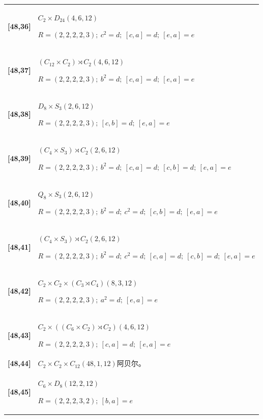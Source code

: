 \documentclass[UTF8,fontset=fandol,11pt,a4paper]{ctexart}
\begin{document}
\begin{longtable}{@{}p{17mm}>{\raggedright\arraybackslash}p{141mm}@{}}
\textbf{[48,36]} & $C_{2}\times D_{24}$\quad $(4,6,12)$\par\(R=(2,2,2,2,3);\allowbreak\ c^{2}=d;\allowbreak\ [c,a]=d;\allowbreak\ [e,a]=e\)\\[3pt]

\textbf{[48,37]} & $(C_{12}\times C_{2})\rtimes C_{2}$\quad $(4,6,12)$\par\(R=(2,2,2,2,3);\allowbreak\ b^{2}=d;\allowbreak\ [c,a]=d;\allowbreak\ [e,a]=e\)\\[3pt]

\textbf{[48,38]} & $D_{8}\times S_{3}$\quad $(2,6,12)$\par\(R=(2,2,2,2,3);\allowbreak\ [c,b]=d;\allowbreak\ [e,a]=e\)\\[3pt]

\textbf{[48,39]} & $(C_{4}\times S_{3})\rtimes C_{2}$\quad $(2,6,12)$\par\(R=(2,2,2,2,3);\allowbreak\ b^{2}=d;\allowbreak\ [c,a]=d;\allowbreak\ [c,b]=d;\allowbreak\ [e,a]=e\)\\[3pt]

\textbf{[48,40]} & $Q_{8}\times S_{3}$\quad $(2,6,12)$\par\(R=(2,2,2,2,3);\allowbreak\ b^{2}=d;\allowbreak\ c^{2}=d;\allowbreak\ [c,b]=d;\allowbreak\ [e,a]=e\)\\[3pt]

\textbf{[48,41]} & $(C_{4}\times S_{3})\rtimes C_{2}$\quad $(2,6,12)$\par\(R=(2,2,2,2,3);\allowbreak\ b^{2}=d;\allowbreak\ c^{2}=d;\allowbreak\ [c,a]=d;\allowbreak\ [c,b]=d;\allowbreak\ [e,a]=e\)\\[3pt]

\textbf{[48,42]} & $C_{2}\times C_{2}\times (C_{3}\rtimes C_{4})$\quad $(8,3,12)$\par\(R=(2,2,2,2,3);\allowbreak\ a^{2}=d;\allowbreak\ [e,a]=e\)\\[3pt]

\textbf{[48,43]} & $C_{2}\times ((C_{6}\times C_{2})\rtimes C_{2})$\quad $(4,6,12)$\par\(R=(2,2,2,2,3);\allowbreak\ [c,a]=d;\allowbreak\ [e,a]=e\)\\[3pt]

\textbf{[48,44]} & $C_{2}\times C_{2}\times C_{12}$\quad $(48,1,12)$\quad 阿贝尔。\\[3pt]

\textbf{[48,45]} & $C_{6}\times D_{8}$\quad $(12,2,12)$\par\(R=(2,2,2,3,2);\allowbreak\ [b,a]=e\)\\[3pt]


\end{longtable}
\end{document}
